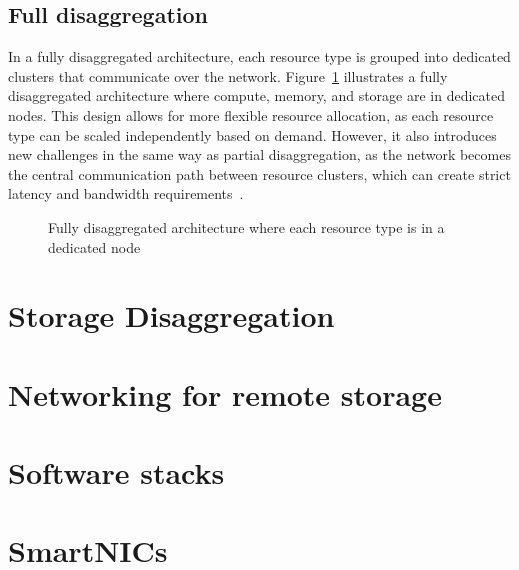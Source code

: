\subsection{Full disaggregation}

In a fully disaggregated architecture, each resource type is grouped into dedicated clusters that communicate over the network. Figure~\ref{fig:full-disaggregation} illustrates a fully disaggregated architecture where compute, memory, and storage are in dedicated nodes. This design allows for more flexible resource allocation, as each resource type can be scaled independently based on demand. However, it also introduces new challenges in the same way as partial disaggregation, as the network becomes the central communication path between resource clusters, which can create strict latency and bandwidth requirements~\cite{lin_disaggregated_2020}.

\begin{figure}[htbp]
	\centering
	\caption{Fully disaggregated architecture where each resource type is in a dedicated node}
	\label{fig:full-disaggregation}
\end{figure}


\section{Storage Disaggregation} \label{sec:storage-disaggregation}


\section{Networking for remote storage} \label{sec:network-remote-storage}


\section{Software stacks}

\section{SmartNICs}





